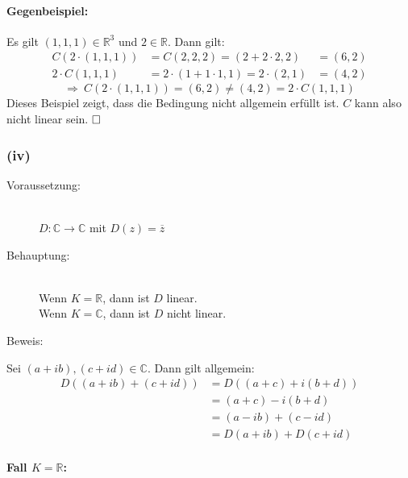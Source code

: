 \documentclass[10pt, a4paper]{article}
\begin{document}
			\paragraph{Gegenbeispiel:} %
			\label{par:gegenbeispiel_}
			
				Es gilt $(1,1,1)\in \mathbb{R}^3$ und $2\in \mathbb{R}$. Dann gilt:
				\begin{align*}
					C(2\cdot (1,1,1)) &= C(2,2,2) = (2+2\cdot2,2) &= (6,2) \\
					2\cdot C(1,1,1) &= 2\cdot(1+1\cdot1,1) = 2\cdot(2,1) &= (4,2)
				\end{align*}
				\[
					\Rightarrow \ C(2\cdot (1,1,1)) = (6,2) \neq (4,2) = 2\cdot C(1,1,1)
				\]
				Dieses Beispiel zeigt, dass die Bedingung nicht allgemein erfüllt ist. $C$ kann also nicht linear sein. $\hfill\Box$



		\subsubsection*{(iv)} %
		\label{ssub:iv}
		
			\begin{description}
				\item[Voraussetzung:] \hfill \\
					$D:\mathbb{C}\longrightarrow\mathbb{C}$ mit $D(z)=\overline{z}$
				\item[Behauptung:] \hfill \\
					Wenn $K = \mathbb{R}$, dann ist $D$ linear.\\
					Wenn $K = \mathbb{C}$, dann ist $D$ nicht linear.
				\item[Beweis:]
			\end{description}
			
			Sei $(a+ib),(c+id)\in \mathbb{C}$. Dann gilt allgemein:
			\begin{align*}
				D((a+ib) + (c+id)) &= D((a+c) + i(b+d))\\
				&= (a+c) -i(b+d) \\
				&= (a-ib) + (c-id) \\
				&= D(a+ib) + D(c+id)
			\end{align*}

			\paragraph{Fall $K = \mathbb{R}$:} %
			\label{par:fall_}
			
\end{document}

